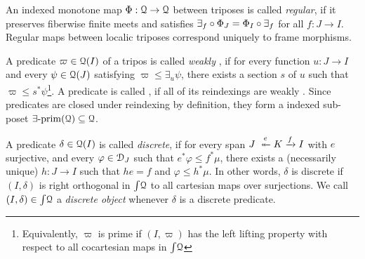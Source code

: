 An indexed monotone map $\Phi:{\EuScript{Q}}\to{\EuScript{Q}}$ between triposes is called
\emph{regular}, if it preserves fiberwise finite meets and satisfies
$\exists_f\circ\Phi_J=\Phi_I\circ\exists_f$ for all $f:J\to I$. Regular maps between
localic triposes correspond uniquely to frame morphisms.

A predicate $\varpi\in{\EuScript{Q}}(I)$ of a tripos is
called \emph{weakly \eprime}, if for every function
$u: J \to I$ and every $\psi\in{\EuScript{Q}}(J)$ satisfying $\varpi\leq\exists_u\psi$,
there exists a section $s$ of $u$ such that $\varpi\leq
s^*\psi$\footnote{Equivalently, $\varpi$ is prime if $(I,\varpi)$ has the left
lifting property with respect to all cocartesian maps in $\textstyle\int\!{\EuScript{Q}}$}. A
predicate is called \emph{\eprime}, if all of its reindexings are weakly
\eprime. Since \eprime predicates are closed under reindexing by definition,
they form a indexed sub-poset $\exists\text{-}\mathrm{prim}({\EuScript{Q}})\subseteq{\EuScript{Q}}$.

A predicate $\delta\in{\EuScript{Q}}(I)$ is called \emph{discrete}, if for every span
$J\xepil{e}K\xrightarrow{f}I$ with $e$ surjective, and every $\varphi\in\EuScript{D}_J$
such that $e^*\varphi\leq f^*\mu$, there exists a (necessarily unique) $h:J\to
I$ such that $he=f$ and $\varphi\leq h^*\mu$. In other words, $\delta$ is
discrete if $(I,\delta)$ is right orthogonal in $\textstyle\int\!{\EuScript{Q}}$ to all cartesian
maps over surjections. We call $(I,\delta)\in\textstyle\int\!{\EuScript{Q}}$ a \emph{discrete
object} whenever $\delta$ is a discrete predicate.

